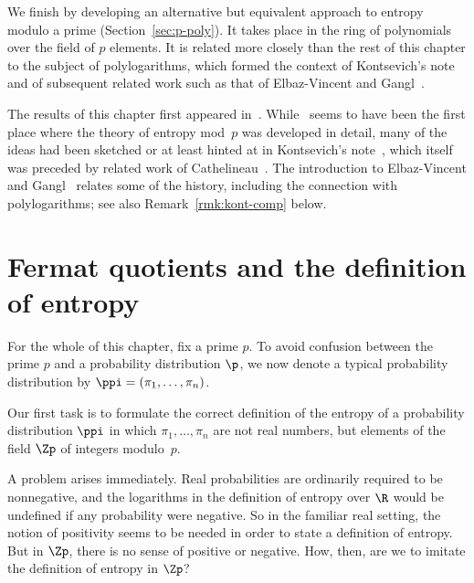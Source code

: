 We finish by developing an alternative but equivalent approach to entropy
modulo a prime (Section~\ref{sec:p-poly}).  It takes place in the ring of
polynomials over the field of $p$ elements.  It is related more closely
than the rest of this chapter to the subject of
polylogarithms, which formed the context of
Kontsevich's note~\cite{KontOHL} and of subsequent related work such as
that of Elbaz-Vincent and Gangl~\cite{EVGOPI,EVGFPM}.

The results of this chapter first appeared in~\cite{EMP}.  While~\cite{EMP}
seems to have been the first place where the theory of entropy mod~$p$ was
developed in detail, many of the ideas had been sketched or at least hinted
at in Kontsevich's note~\cite{KontOHL}, which itself was preceded by
related work of Cathelineau~\cite{CathSHS,CathRDP}.%
%
% 
The introduction to Elbaz-Vincent and Gangl~\cite{EVGOPI} relates some of
the history, including the connection with polylogarithms; see also
Remark~\ref{rmk:kont-comp} below.


\section{Fermat quotients and the definition of entropy}


For the whole of this chapter, fix a prime $p$.  To avoid confusion between
the prime $p$ and a probability distribution $\p$, we now denote a typical
probability distribution by $\ppi = (\pi_1, \ldots, \pi_n)$.

Our first task is to formulate the correct definition of the entropy of a
probability%
%
% 
distribution $\ppi$ in which $\pi_1, \ldots, \pi_n$ are not real numbers,
but elements of the field $\Zp$ of integers modulo~$p$.

A problem arises immediately.  Real probabilities are ordinarily required to
be nonnegative, and the logarithms in the definition of entropy over $\R$
would be undefined if any probability were negative.  So in the familiar
real setting, the notion of positivity seems to be needed in order to state
a definition of entropy.  But in $\Zp$, there is no sense of positive or
negative.  How, then, are we to imitate the definition of entropy in
$\Zp$?

